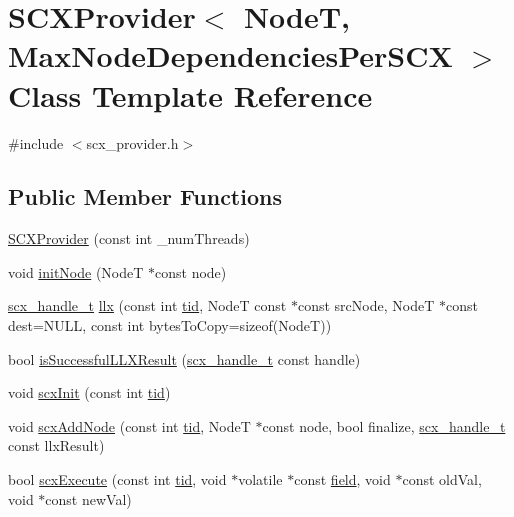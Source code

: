 \hypertarget{classSCXProvider}{}\section{S\+C\+X\+Provider$<$ NodeT, Max\+Node\+Dependencies\+Per\+S\+CX $>$ Class Template Reference}
\label{classSCXProvider}


{\ttfamily \#include $<$scx\+\_\+provider.\+h$>$}

\subsection*{Public Member Functions}
\begin{DoxyCompactItemize}
\item 
\hyperlink{classSCXProvider_a98e2838c5e388b23143b4ac68721ca33}{S\+C\+X\+Provider} (const int \+\_\+num\+Threads)
\item 
void \hyperlink{classSCXProvider_ad68b83e76f7aa9d6d1abaa5e93f1ca72}{init\+Node} (NodeT $\ast$const node)
\item 
\hyperlink{scx__provider_8h_a368fa55a4b553010913289d3cbe6ce22}{scx\+\_\+handle\+\_\+t} \hyperlink{classSCXProvider_aa521eed22367f99ada4acba67e6f3f89}{llx} (const int \hyperlink{microbench_2main_8cpp_a9ca9869868fe7e7a38a921cc7de4103f}{tid}, NodeT const $\ast$const src\+Node, NodeT $\ast$const dest=N\+U\+LL, const int bytes\+To\+Copy=sizeof(NodeT))
\item 
bool \hyperlink{classSCXProvider_a49b1076e1a2b4e7af32bc298a1c7a438}{is\+Successful\+L\+L\+X\+Result} (\hyperlink{scx__provider_8h_a368fa55a4b553010913289d3cbe6ce22}{scx\+\_\+handle\+\_\+t} const handle)
\item 
void \hyperlink{classSCXProvider_a43155a1068ae855fb6c0b386d2538693}{scx\+Init} (const int \hyperlink{microbench_2main_8cpp_a9ca9869868fe7e7a38a921cc7de4103f}{tid})
\item 
void \hyperlink{classSCXProvider_ab7285a46263d7b6885e21e73b4e6ec6b}{scx\+Add\+Node} (const int \hyperlink{microbench_2main_8cpp_a9ca9869868fe7e7a38a921cc7de4103f}{tid}, NodeT $\ast$const node, bool finalize, \hyperlink{scx__provider_8h_a368fa55a4b553010913289d3cbe6ce22}{scx\+\_\+handle\+\_\+t} const llx\+Result)
\item 
bool \hyperlink{classSCXProvider_a33cbfd79cc911b36aba19311a30893dd}{scx\+Execute} (const int \hyperlink{microbench_2main_8cpp_a9ca9869868fe7e7a38a921cc7de4103f}{tid}, void $\ast$volatile $\ast$const \hyperlink{scxrecord_8h_a0657af583030a13da27c9e6d5ec40aa4}{field}, void $\ast$const old\+Val, void $\ast$const new\+Val)
\end{DoxyCompactItemize}
